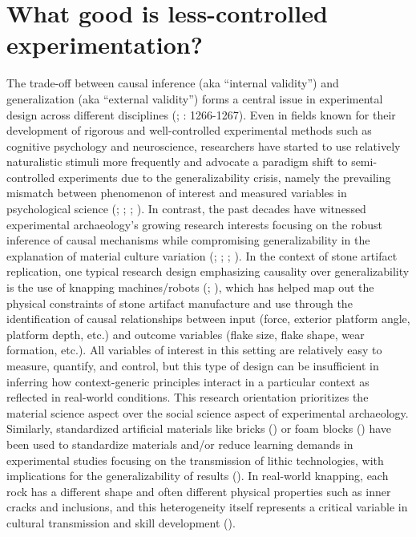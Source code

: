 \documentclass[
  11pt,
  letterpaper,
  DIV=11,
  numbers=noendperiod]{scrartcl}
\begin{document}
\section{What good is less-controlled
experimentation?}\label{what-good-is-less-controlled-experimentation}

The trade-off between causal inference (aka ``internal validity'') and
generalization (aka ``external validity'') forms a central issue in
experimental design across different disciplines
(; : 1266-1267). Even in fields known for their development
of rigorous and well-controlled experimental methods such as cognitive
psychology and neuroscience, researchers have started to use relatively
naturalistic stimuli more frequently and advocate a paradigm shift to
semi-controlled experiments due to the generalizability crisis, namely
the prevailing mismatch between phenomenon of interest and measured
variables in psychological science (; ; ;
). In contrast, the past
decades have witnessed experimental archaeology's growing research
interests focusing on the robust inference of causal mechanisms while
compromising generalizability in the explanation of material culture
variation (;
;
;
). In the context of
stone artifact replication, one typical research design emphasizing
causality over generalizability is the use of knapping machines/robots
(;
), which has helped
map out the physical constraints of stone artifact manufacture and use
through the identification of causal relationships between input (force,
exterior platform angle, platform depth, etc.) and outcome variables
(flake size, flake shape, wear formation, etc.). All variables of
interest in this setting are relatively easy to measure, quantify, and
control, but this type of design can be insufficient in inferring how
context-generic principles interact in a particular context as reflected
in real-world conditions. This research orientation prioritizes the
material science aspect over the social science aspect of experimental
archaeology. Similarly, standardized artificial materials like bricks
() or foam blocks
() have been
used to standardize materials and/or reduce learning demands in
experimental studies focusing on the transmission of lithic
technologies, with implications for the generalizability of results
(). In real-world knapping, each
rock has a different shape and often different physical properties such
as inner cracks and inclusions, and this heterogeneity itself represents
a critical variable in cultural transmission and skill development
().
\end{document}
